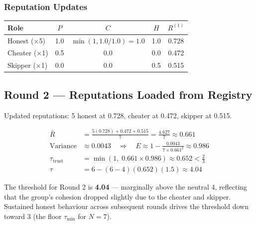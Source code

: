 \documentclass[12pt,a4paper]{article}
\theoremstyle{definition}
\theoremstyle{remark}
\begin{document}
\subsubsection*{Reputation Updates}
\begin{center}
\begin{tabular}{lcccc}
\toprule
Role & $P$ & $C$ & $H$ & $R^{(1)}$ \\
\midrule
Honest (×5) & 1.0 & $\min(1, 1.0/1.0)=1.0$ & 1.0 & 0.728 \\
Cheater (×1) & 0.5 & 0.0 & 0.0 & 0.472 \\
Skipper (×1) & 0.0 & 0.0 & 0.5 & 0.515 \\
\bottomrule
\end{tabular}
\end{center}

\subsection{Round 2 — Reputations Loaded from Registry}

Updated reputations: 5 honest at 0.728, cheater at 0.472, skipper at 0.515.

\begin{align*}
  \bar{R} &= \tfrac{5(0.728)+0.472+0.515}{7} = \tfrac{4.627}{7} \approx 0.661 \\
  \text{Variance} &\approx 0.0043 \quad \Rightarrow \quad
  E \approx 1 - \tfrac{0.0043}{7 \times 0.661^2} \approx 0.986 \\
  \tau_{\text{trust}} &= \min(1,\; 0.661 \times 0.986) \approx 0.652 < \tfrac{2}{3}\\
  \tau &= 6 - (6-4)(0.652)(1.5) \approx 4.04
\end{align*}

The threshold for Round 2 is \textbf{4.04} — marginally above the neutral 4,
reflecting that the group's cohesion dropped slightly due to the cheater
and skipper. Sustained honest behaviour across subsequent rounds drives the
threshold down toward 3 (the floor $\tau_{\text{min}}$ for $N=7$).
\end{document}
